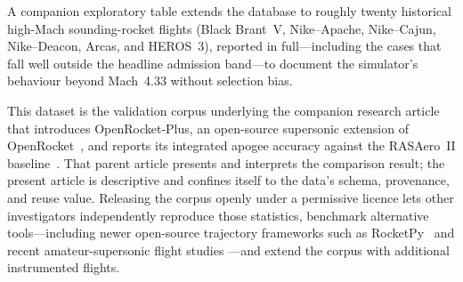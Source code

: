 A companion exploratory table extends the database to roughly twenty historical
high-Mach sounding-rocket flights (Black Brant~V, Nike--Apache, Nike--Cajun,
Nike--Deacon, Arcas, and HEROS~3), reported in full---including the cases that fall
well outside the headline admission band---to document the simulator's behaviour
beyond Mach~4.33 without selection bias.

This dataset is the validation corpus underlying the companion research article that
introduces OpenRocket-Plus, an open-source supersonic extension of
OpenRocket~\cite{niskanen2009}, and reports its integrated apogee accuracy against
the RASAero~II baseline~\cite{yu2026jsr}. That parent article presents and interprets
the comparison result; the present article is descriptive and confines itself to the
data's schema, provenance, and reuse value. Releasing the corpus openly under a
permissive licence lets other investigators independently reproduce those statistics,
benchmark alternative tools---including newer open-source trajectory frameworks such
as RocketPy~\cite{rocketpy2021} and recent amateur-supersonic flight studies
\cite{quintart2025,lowcostroll2025}---and extend the corpus with additional
instrumented flights.
